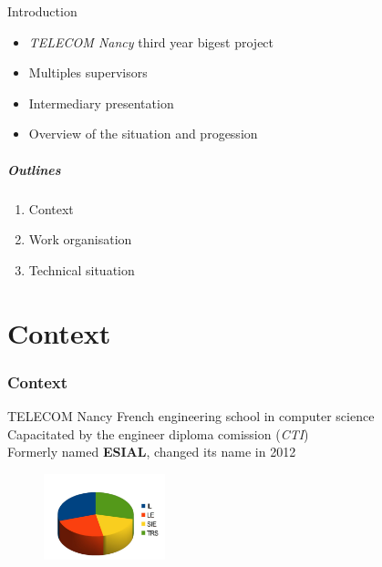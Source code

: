 \documentclass[12pt]{beamer}
\title{\titreA}
\subtitle{\titreB}
\author{Nicolas BOUGET, Julien GUEPIN, Marc PINHEDE, Julien VAUBOURG}
\institute{TELECOM Nancy}
\date{December 20, 2012}
\begin{document}
\begin{frame}
\titlepage
\end{frame}

\begin{frame}{Introduction}
    \begin{itemize}
	\item \emph{TELECOM Nancy} third year bigest project
	\vfill
	\item Multiples supervisors
	\vfill
	\item Intermediary presentation
	\vfill
	\item Overview of the situation and progession
    \end{itemize}
\end{frame}

\begin{frame}
    \frametitle{Outlines}
    \begin{enumerate}
	\item \large{Context}
	\vfill
	\item \large{Work organisation}
	\vfill
	\item \large{Technical situation}
    \end{enumerate}
\end{frame}



    
\part{Context}
\frame{\partpage}
\section{Context}

\begin{frame}{TELECOM Nancy}
    French engineering school in computer science\\
    \vfill
    Capacitated by the engineer diploma comission (\emph{CTI})\\
    \vfill
    Formerly named \textbf{ESIAL}, changed its name in 2012\\
    \vfill
    \begin{figure}
	\includegraphics[width=100pt]{img/promo.jpg}
    \end{figure}
\end{frame}
\end{document}
